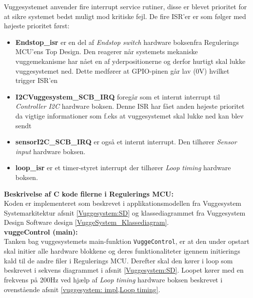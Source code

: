 
Vuggesystemet anvender fire interrupt service rutiner, disse er blevet prioritet for at sikre systemet bedst muligt mod kritiske fejl. De fire ISR'er er som følger med højeste prioritet først:
\begin{itemize}
\item \textbf{Endstop\_isr} er en del af \textit{Endstop switch} hardware boksen\footnotemark  fra Regulerings MCU'ens Top Design. Den reagerer når systemets mekaniske vuggemekanisme har nået en af yderpositionerne og derfor hurtigt skal lukke vuggesystemet ned. Dette medfører at GPIO-pinen går lav (0V) hvilket trigger ISR'en
\item \textbf{I2CVuggesystem\_SCB\_IRQ} foregår som et internt interrupt til \textit{Controller I2C} hardware boksen. Denne ISR har fået anden højeste prioritet da vigtige informationer som f.eks at vuggesystemet skal lukke ned kan blev sendt
\item \textbf{sensorI2C\_SCB\_IRQ} er også et internt interrupt. Den tilhører \textit{Sensor input} hardware boksen. 
\item \textbf{loop\_isr} er et timer-styret interrupt der tilhører \textit{Loop timing} hardware boksen. 
\end{itemize}



\textbf{Beskrivelse af C kode filerne i Regulerings MCU:} \\
Koden er implementeret som beskrevet i applikationsmodellen fra Vuggesystem Systemarkitektur afsnit \vref{Vuggesystem:SD} og klassediagrammet fra Vuggesystem Design Software design \vref{VuggeSystem_Klassediagram}. \\


\textbf{vuggeControl (main):} \\
Tanken bag vuggesystemets main-funktion \verb+VuggeControl+, er at den under opstart skal initier alle hardware blokkene og deres funktionaliteter igennem initierings kald til de andre  filer i Regulerings MCU. Derefter skal den kører i loop som beskrevet i sekvens diagrammet i afsnit \vref{Vuggesystem:SD}. Loopet kører med en frekvens på 200Hz ved hjælp af \textit{Loop timing} hardware boksen beskrevet i ovenstående afsnit \vref{vuggesystem: impl,Loop timing}. \\ 

